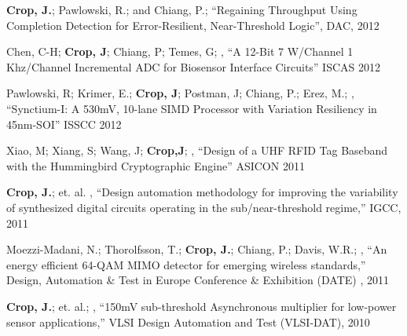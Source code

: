 \documentclass[line,margin]{res}
\begin{document}
\begin{resume}
\textbf{Crop, J.}; Pawlowski, R.; and Chiang, P.; ``Regaining Throughput Using Completion Detection for Error-Resilient, Near-Threshold Logic'', DAC, 2012

Chen, C-H; \textbf{Crop, J}; Chiang, P; Temes, G; , ``A 12-Bit 7 W/Channel 1 Khz/Channel Incremental ADC for Biosensor Interface Circuits'' ISCAS 2012

Pawlowski, R; Krimer, E.; \textbf{Crop, J}; Postman, J; Chiang, P.; Erez, M.; , ``Synctium-I: A 530mV, 10-lane SIMD Processor with Variation Resiliency in 45nm-SOI'' ISSCC 2012

Xiao, M; Xiang, S; Wang, J; \textbf{Crop,J}; , ``Design of a UHF RFID Tag Baseband with the Hummingbird Cryptographic Engine'' ASICON 2011


\textbf{Crop, J.}; et. al. , ``Design automation methodology for improving the variability of synthesized digital circuits operating in the sub/near-threshold regime,'' IGCC, 2011 

Moezzi-Madani, N.; Thorolfsson, T.; \textbf{Crop, J.}; Chiang, P.; Davis, W.R.; , ``An energy efficient 64-QAM MIMO detector for emerging wireless standards,''  Design, Automation \& Test in Europe Conference \& Exhibition (DATE) , 2011

\textbf{Crop, J.}; et. al.; , ``150mV sub-threshold Asynchronous multiplier for low-power sensor applications,'' VLSI Design Automation and Test (VLSI-DAT), 2010

\end{resume}
\end{document}

